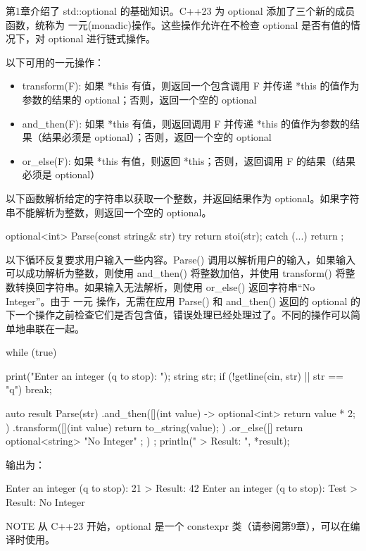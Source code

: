 

第1章介绍了 std::optional 的基础知识。C++23 为 optional 添加了三个新的成员函数，统称为 一元(monadic)操作。这些操作允许在不检查 optional 是否有值的情况下，对 optional 进行链式操作。

以下可用的一元操作：

\begin{itemize}
\item
transform(F): 如果 *this 有值，则返回一个包含调用 F 并传递 *this 的值作为参数的结果的 optional；否则，返回一个空的 optional

\item
and\_then(F): 如果 *this 有值，则返回调用 F 并传递 *this 的值作为参数的结果（结果必须是 optional）；否则，返回一个空的 optional

\item
or\_else(F): 如果 *this 有值，则返回 *this；否则，返回调用 F 的结果（结果必须是 optional）
\end{itemize}

以下函数解析给定的字符串以获取一个整数，并返回结果作为 optional。如果字符串不能解析为整数，则返回一个空的 optional。

\begin{cpp}
optional<int> Parse(const string& str)
{
    try { return stoi(str); }
    catch (...) { return {}; }
}
\end{cpp}

以下循环反复要求用户输入一些内容。Parse() 调用以解析用户的输入，如果输入可以成功解析为整数，则使用 and\_then() 将整数加倍，并使用 transform() 将整数转换回字符串。如果输入无法解析，则使用 or\_else() 返回字符串“No Integer”。由于 一元 操作，无需在应用 Parse() 和 and\_then() 返回的 optional 的下一个操作之前检查它们是否包含值，错误处理已经处理过了。不同的操作可以简单地串联在一起。

\begin{cpp}
while (true) {
    print("Enter an integer (q to stop): ");
    string str;
    if (!getline(cin, str) || str == "q") { break; }

    auto result { Parse(str)
        .and_then([](int value) -> optional<int> { return value * 2; })
        .transform([](int value) { return to_string(value); })
        .or_else([] { return optional<string> { "No Integer" }; }) };
    println(" > Result: {}", *result);
}
\end{cpp}

输出为：

\begin{shell}
Enter an integer (q to stop): 21
    > Result: 42
Enter an integer (q to stop): Test
    > Result: No Integer
\end{shell}

\begin{myNotic}{NOTE}
从 C++23 开始，optional 是一个 constexpr 类（请参阅第9章），可以在编译时使用。
\end{myNotic}


